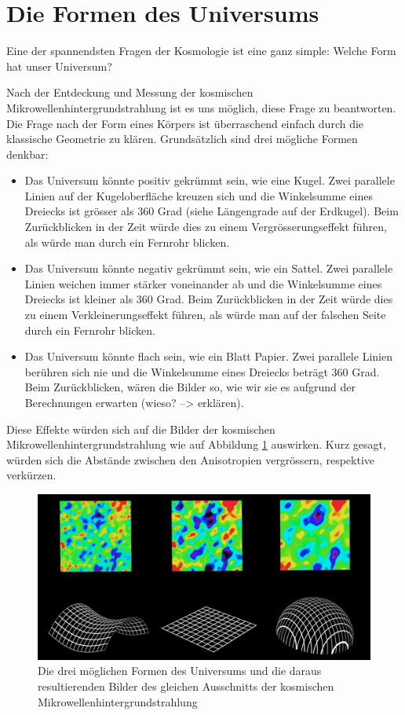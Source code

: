 \section{Die Formen des Universums}
Eine der spannendsten Fragen der Kosmologie ist eine ganz simple: Welche Form 
hat unser Universum?

Nach der Entdeckung und Messung der kosmischen Mikrowellenhintergrundstrahlung 
ist es uns möglich, diese Frage zu beantworten.
Die Frage nach der Form eines Körpers ist überraschend einfach durch die 
klassische Geometrie zu klären.
Grundsätzlich sind drei mögliche Formen denkbar:
\begin{itemize}
	\item Das Universum könnte positiv gekrümmt sein, wie eine Kugel.
	Zwei parallele Linien auf der Kugeloberfläche kreuzen sich und die 
	Winkelsumme eines Dreiecks ist grösser als 360 Grad (siehe Längengrade auf der Erdkugel).
	Beim Zurückblicken in der Zeit würde dies zu einem Vergrösserungseffekt führen,
	als würde man durch ein Fernrohr blicken.
	\item Das Universum könnte negativ gekrümmt sein, wie ein Sattel.
	Zwei parallele Linien weichen immer stärker voneinander ab und die 
	Winkelsumme eines Dreiecks ist kleiner als 360 Grad.
	Beim Zurückblicken in der Zeit würde dies zu einem Verkleinerungseffekt führen,
	als würde man auf der falschen Seite durch ein Fernrohr blicken.
	\item Das Universum könnte flach sein, wie ein Blatt Papier.
	Zwei parallele Linien berühren sich nie und die Winkelsumme eines Dreiecks 
	beträgt 360 Grad.
	Beim Zurückblicken, wären die Bilder so, wie wir sie es aufgrund der Berechnungen erwarten (wieso? --> erklären).
\end{itemize}

Diese Effekte würden sich auf die Bilder der kosmischen Mikrowellenhintergrundstrahlung
wie auf Abbildung \ref{fig:universe_shapes} auswirken.
Kurz gesagt, würden sich die Abstände zwischen den Anisotropien vergrössern, respektive verkürzen.

\begin{figure}
	\includegraphics[width=\linewidth]{cmb/images/universe_shapes.jpg}
	\caption{Die drei möglichen Formen des Universums und die daraus 
		resultierenden Bilder des gleichen Ausschnitts der kosmischen
		Mikrowellenhintergrundstrahlung}
	\label{fig:universe_shapes}
\end{figure}

